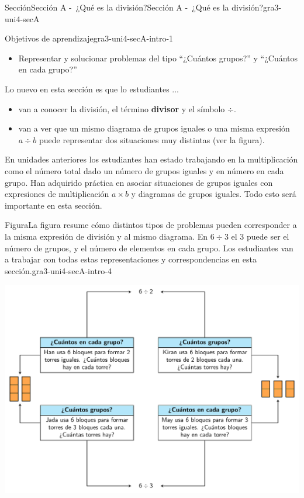 \documentclass[oneside,10pt,]{article}
\newcommand{\terminology}[1]{\textbf{#1}}
\begin{document}
\begin{sectionptx}{Sección}{Sección A -~¿Qué es la división?}{}{Sección A -~¿Qué es la división?}{}{}{gra3-uni4-secA}
\begin{introduction}{}%
\begin{objectives}{Objetivos de aprendizaje}{gra3-uni4-secA-intro-1}
%
\begin{itemize}[label=\textbullet]
\item{}Representar y solucionar problemas del tipo “¿Cuántos grupos?” y “¿Cuántos en cada grupo?”%
\end{itemize}
\end{objectives}
Lo nuevo en esta sección es que lo estudiantes ...%
\begin{itemize}[label=\textbullet]
\item{}van a conocer la división, el término \terminology{divisor} y el símbolo \(\div\).%
\item{}van a ver que un mismo diagrama de grupos iguales o una misma expresión \(a\div b\) puede representar dos situaciones muy distintas (ver la figura).%
\end{itemize}
%
\par
En unidades anteriores los estudiantes han estado trabajando en la multiplicación como el número total dado un número de grupos iguales y en número en cada grupo. Han adquirido práctica en asociar situaciones de grupos iguales con expresiones de multiplicación \(a\times b\) y diagramas de grupos iguales. Todo esto será importante en esta sección.%
\begin{figureptx}{Figura}{La figura resume cómo distintos tipos de problemas pueden corresponder a la misma expresión de división y al mismo diagrama. En \(6\div 3\) el 3 puede ser el número de grupos, y el número de elementos en cada grupo. Los estudiantes van a trabajar con todas estas representaciones y correspondencias en esta sección.}{gra3-uni4-secA-intro-4}{}%
\begin{image}{0}{1}{0}{}%
\includegraphics[width=\linewidth]{external/tikz-source/tikz-file-3-4-A-BlockDiagram.pdf}

\end{image}
\end{figureptx}
\end{introduction}
\end{sectionptx}
\end{document}
